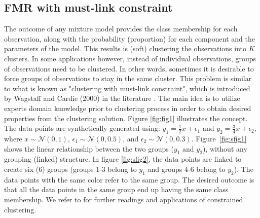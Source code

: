 \documentclass[12pt]{article}
\begin{document}
\subsection{FMR with must-link constraint}
The outcome of any mixture model provides the class membership for each observation, along with the probability (proportion) for each component and the parameters of the model. This results is (soft) clustering the observations into $K$ clusters.
In some applications however, instead of individual observations, groups of observations need to be clustered. In other words, sometimes it is desirable to force groups of observations to stay in the same cluster. This problem is similar to what is known as "clustering with must-link constraint", which is introduced by Wagstaff and Cardie (2000) in the literature \citep{Wagstaff:2001}. The main idea is to utilize experts domain knowledge prior to clustering process in order to obtain  desired properties from the clustering solution. Figure \ref{fig:fig1} illustrates the concept. The data points are synthetically generated using: $y_1 = \frac{1}{2}x+\epsilon_1$ and $ y_2 = \frac{3}{4}x+\epsilon_2$, where $x \sim \mathcal{N}(0,1)$, $\epsilon_1 \sim \mathcal{N}(0,0.5)$, and $\epsilon_2 \sim \mathcal{N}(0,0.3)$. Figure~\ref{fig:sfig1} shows the linear relationship between the two groups ($y_1$ and $y_2$), without any grouping (linked) structure. In figure \ref{fig:sfig2}, the data points are linked to create six (6) groups (groups 1-3 belong to $y_1$ and groups 4-6 belong to $y_2$). The data points with the same color refer to the same group. The desired outcome is that all the data points in the same group end up having the same class membership. We refer to \citep{Berkhin2006, basu2009constrained, davidson2007survey, wagstaff2002intelligent, xing2002distance, davidson2007efficient, davidson2005agglomerative, law2005model, yang2001feasible, yan2006discriminative, segal2003discovering, dhillon2001efficient} for further readings and applications of constrained clustering. \par
\end{document}
